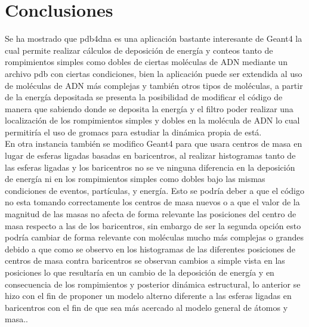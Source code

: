 \clearpage
\section{Conclusiones}
\label{sec:res}
Se ha mostrado que pdb4dna es una aplicación bastante interesante de Geant4 la cual permite realizar cálculos de deposición de energía y conteos tanto de rompimientos simples como dobles de ciertas moléculas de ADN mediante un archivo pdb con ciertas condiciones, bien la aplicación puede ser extendida al uso de moléculas de ADN más complejas y también otros tipos de moléculas, a partir de la energía depositada se presenta la posibilidad de modificar el código de manera que sabiendo donde se deposita la energía y el filtro poder realizar una localización de los rompimientos simples y dobles en la molécula de ADN lo cual permitiría el uso de gromacs para estudiar la dinámica propia de está.\\
En otra instancia también se modifico Geant4 para que usara centros de masa en lugar de esferas ligadas basadas en baricentros, al realizar histogramas tanto de las esferas ligadas y los baricentros no se ve ninguna diferencia en la deposición de energía ni en los rompimientos simples como dobles bajo las mismas condiciones de eventos, partículas, y energía. Esto se podría deber a que el código no esta tomando correctamente los centros de masa nuevos o a que el valor de la magnitud de las masas no afecta de forma relevante las posiciones del centro de masa respecto a las de los baricentros, sin embargo de ser la segunda opción esto podría cambiar de forma relevante con moléculas mucho más complejas o grandes debido a que como se observo en los histogramas de las diferentes posiciones de centros de masa contra baricentros se observan cambios a simple vista en las posiciones lo que resultaría en un cambio de la deposición de energía y en consecuencia de los rompimientos y posterior dinámica estructural, lo anterior se hizo con el fin de proponer un modelo alterno diferente a las esferas ligadas en baricentros con el fin de que sea más acercado al modelo general de átomos y masa..
